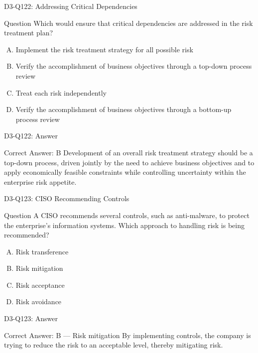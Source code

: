 \documentclass{beamer}
\begin{document}
	\begin{frame}{D3-Q122: Addressing Critical Dependencies}
		\begin{block}{Question}
			Which would ensure that critical dependencies are addressed in the risk treatment plan?
		\end{block}
		\begin{enumerate}[(A)]
			\item Implement the risk treatment strategy for all possible risk
			\item Verify the accomplishment of business objectives through a top-down process review
			\item Treat each risk independently
			\item Verify the accomplishment of business objectives through a bottom-up process review
		\end{enumerate}
	\end{frame}
	\begin{frame}{D3-Q122: Answer}
		\begin{block}{Correct Answer: B}
			Development of an overall risk treatment strategy should be a top-down process, driven jointly by the need to achieve business objectives and to apply economically feasible constraints while controlling uncertainty within the enterprise risk appetite.
		\end{block}
	\end{frame}
	
	\begin{frame}{D3-Q123: CISO Recommending Controls}
		\begin{block}{Question}
			A CISO recommends several controls, such as anti-malware, to protect the enterprise's information systems. Which approach to handling risk is being recommended?
		\end{block}
		\begin{enumerate}[(A)]
			\item Risk transference
			\item Risk mitigation
			\item Risk acceptance
			\item Risk avoidance
		\end{enumerate}
	\end{frame}
	\begin{frame}{D3-Q123: Answer}
		\begin{block}{Correct Answer: B --- Risk mitigation}
			By implementing controls, the company is trying to reduce the risk to an acceptable level, thereby mitigating risk.
		\end{block}
	\end{frame}
	
\end{document}
